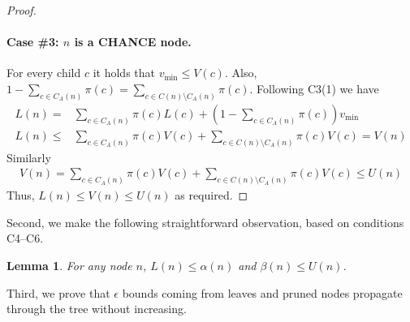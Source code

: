 \documentclass[letterpaper]{article} %
\newtheorem{lemma}{Lemma}
\newcommand{\MM}{\mathit{V}}
\newcommand{\pess}{\mathit{L}}
\newcommand{\opti}{\mathit{U}}
\newcommand{\vmax}{v_{\text{max}}}
\newcommand{\vmin}{v_{\text{min}}}
\begin{document}
\begin{proof}
\paragraph{Case \#3: $n$ is a CHANCE node.}
For every child $c$ it holds that $\vmin\leq \MM(c)$. 
Also, $1-\sum_{c\in C_A(n)} \pi(c) = \sum_{c\in C(n) \setminus C_A(n)} \pi(c)$. Following C3(1) we have
\begin{align}
 \pess(n) = & \!\sum_{c\in C_A(n)\!\!\!\!\!} \!\!\!\pi(c) \pess(c)+ (1-\!\!\!\sum_{c\in C_A(n)\!\!\!\!\!}\!\! \pi(c)) \vmin \\
 \pess(n) \leq & \!\sum_{c\in C_A(n)\!\!\!\!\!} \!\!\!\pi(c) \MM(c)+ \!\!\!\!\sum_{c\in C(n) \setminus C_A(n)\!\!\!\!\!\!\!\!\!\!\!\!}\!\!\!\!\!\pi(c) \MM(c) = V(n)
\end{align}
Similarly
\begin{align}
 \MM(n) = \!\sum_{c\in C_A(n)\!\!\!\!\!} \!\!\!\pi(c) \MM(c)+ \!\!\!\!\sum_{c\in C(n) \setminus C_A(n)\!\!\!\!\!\!\!\!\!\!\!\!}\!\!\!\!\!\pi(c) \MM(c) \leq \opti(n)
\end{align}
Thus, $\pess(n) \leq \MM(n) \leq \opti(n)$ as required.
\end{proof}

Second, we make the following straightforward observation, based on conditions C4--C6.

\begin{lemma}
For any node $n$, $\pess(n) \!\leq\! \alpha(n)$ and $\beta(n) \leq \opti(n)$.
\label{lem:alpha-beta-between-l-u}
\end{lemma}

Third, we prove that $\epsilon$ bounds coming from leaves and pruned nodes propagate through the tree without increasing.
\end{document}
